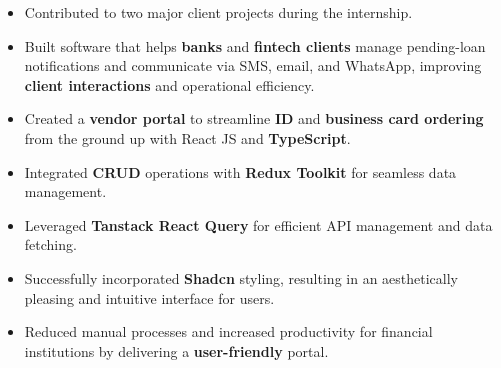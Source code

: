 \documentclass[10pt,a4paper,ragged2e]{altacv}
\begin{document}
\begin{itemize}
\item Contributed to two major client projects during the internship. 
\item Built software that helps \textbf{banks} and \textbf{fintech clients} manage pending-loan notifications and communicate via SMS, email, and WhatsApp, improving \textbf{client interactions} and operational efficiency.
\smallskip
\item Created a \textbf{vendor portal} to streamline \textbf{ID} and \textbf{business card ordering} from the ground up with React JS and \textbf{TypeScript}.
\smallskip
\item Integrated \textbf{CRUD} operations with \textbf{Redux Toolkit} for seamless data management.
\smallskip
\item Leveraged \textbf{Tanstack React Query} for efficient API management and data fetching.
\smallskip
\item Successfully incorporated \textbf{Shadcn} styling, resulting in an aesthetically pleasing and intuitive interface for users.
\smallskip
\item Reduced manual processes and increased productivity for financial institutions by delivering a \textbf{user-friendly} portal.
\end{itemize}


\end{document}

